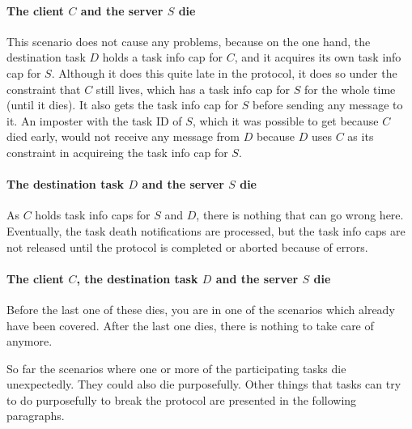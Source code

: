 \paragraph{The client $C$ and the server $S$ die}

This scenario does not cause any problems, because on the one hand,
the destination task $D$ holds a task info cap for $C$, and it
acquires its own task info cap for $S$.  Although it does this quite
late in the protocol, it does so under the constraint that $C$ still
lives, which has a task info cap for $S$ for the whole time (until it
dies).  It also gets the task info cap for $S$ before sending any
message to it.  An imposter with the task ID of $S$, which it was
possible to get because $C$ died early, would not receive any message
from $D$ because $D$ uses $C$ as its constraint in acquireing the task
info cap for $S$.

\paragraph{The destination task $D$ and the server $S$ die}

As $C$ holds task info caps for $S$ and $D$, there is nothing that can
go wrong here.  Eventually, the task death notifications are
processed, but the task info caps are not released until the protocol
is completed or aborted because of errors.

\paragraph{The client $C$, the destination task $D$ and the server $S$ die}

Before the last one of these dies, you are in one of the scenarios
which already have been covered.  After the last one dies, there is
nothing to take care of anymore.

\begin{comment}
  In this case your problem is probably not the capability copy
  protocol, but the stability of your software!  Go fix some bugs.
\end{comment}

So far the scenarios where one or more of the participating tasks die
unexpectedly.  They could also die purposefully.  Other things that
tasks can try to do purposefully to break the protocol are presented
in the following paragraphs.

\begin{comment}
  A task that tries to harm other tasks by not following a protocol
  and behaving as other tasks might expect it is malicious.  Beside
  security concerns, this is also an issue of robustness, because
  malicious behaviour can also be triggered by bugs rather than bad
  intentions.
  
  It is difficult to protect against malicious behaviour by trusted
  components, like the server $S$, which is trusted by both $C$ and
  $D$.  If a trusted component is compromised or buggy, ill
  consequences for software that trusts it must be expected.  Thus, no
  analysis is provided for scenarious involving a malicious or buggy
  server $S$.
\end{comment}

